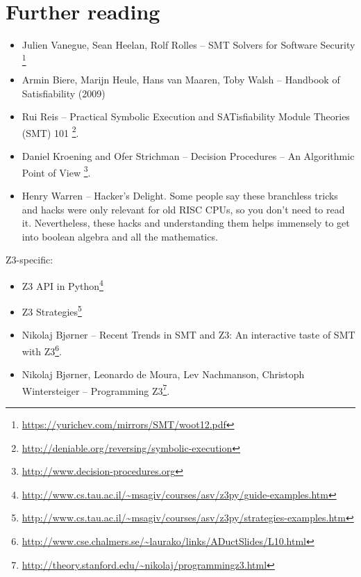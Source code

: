 \section{Further reading}

\begin{itemize}
\item Julien Vanegue, Sean Heelan, Rolf Rolles -- SMT Solvers for Software Security
\footnote{\url{https://yurichev.com/mirrors/SMT/woot12.pdf}}

\item Armin Biere, Marijn Heule, Hans van Maaren, Toby Walsh -- Handbook of Satisfiability (2009)

\item Rui Reis -- Practical Symbolic Execution and SATisfiability Module Theories (SMT) 101
\footnote{\url{http://deniable.org/reversing/symbolic-execution}}.

\item Daniel Kroening and Ofer Strichman -- Decision Procedures -- An Algorithmic Point of View
\footnote{\url{http://www.decision-procedures.org}}.

\item Henry Warren -- Hacker's Delight.
Some people say these branchless tricks and hacks were only relevant for old RISC CPUs, so you don't need to read it.
Nevertheless, these hacks and understanding them helps immensely to get into boolean algebra and all the mathematics.
\end{itemize}

Z3-specific:

\begin{itemize}
\item Z3 API in Python\footnote{\url{http://www.cs.tau.ac.il/~msagiv/courses/asv/z3py/guide-examples.htm}}

\item Z3 Strategies\footnote{\url{http://www.cs.tau.ac.il/~msagiv/courses/asv/z3py/strategies-examples.htm}}

\item Nikolaj Bjørner -- Recent Trends in SMT and Z3: An interactive taste of SMT with Z3\footnote{\url{http://www.cse.chalmers.se/~laurako/links/ADuctSlides/L10.html}}.

\item Nikolaj Bjørner, Leonardo de Moura, Lev Nachmanson, Christoph Wintersteiger -- Programming Z3\footnote{\url{http://theory.stanford.edu/~nikolaj/programmingz3.html}}.
\end{itemize}


